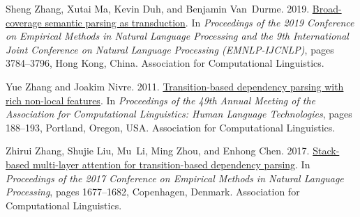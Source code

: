 \documentclass[11pt,a4paper]{article}
\begin{document}
\begin{thebibliography}{34}
Sheng Zhang, Xutai Ma, Kevin Duh, and Benjamin Van~Durme. 2019.
\newblock \href {https://www.aclweb.org/anthology/D19-1392} {Broad-coverage
  semantic parsing as transduction}.
\newblock In \emph{Proceedings of the 2019 Conference on Empirical Methods in
  Natural Language Processing and the 9th International Joint Conference on
  Natural Language Processing (EMNLP-IJCNLP)}, pages 3784--3796, Hong Kong,
  China. Association for Computational Linguistics.

Yue Zhang and Joakim Nivre. 2011.
\newblock \href {https://www.aclweb.org/anthology/P11-2033} {Transition-based
  dependency parsing with rich non-local features}.
\newblock In \emph{Proceedings of the 49th Annual Meeting of the Association
  for Computational Linguistics: Human Language Technologies}, pages 188--193,
  Portland, Oregon, USA. Association for Computational Linguistics.

Zhirui Zhang, Shujie Liu, Mu~Li, Ming Zhou, and Enhong Chen. 2017.
\newblock \href {https://doi.org/10.18653/v1/D17-1175} {Stack-based multi-layer
  attention for transition-based dependency parsing}.
\newblock In \emph{Proceedings of the 2017 Conference on Empirical Methods in
  Natural Language Processing}, pages 1677--1682, Copenhagen, Denmark.
  Association for Computational Linguistics.

\end{thebibliography}
 
\end{document}
